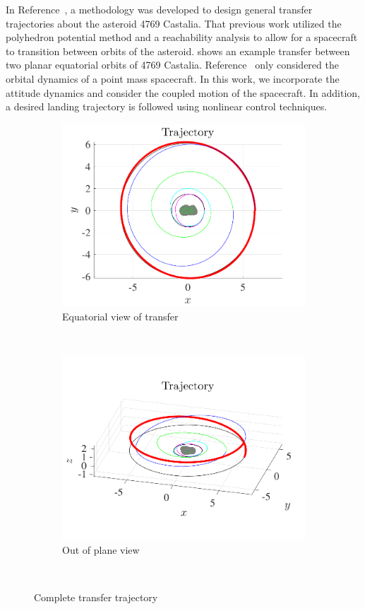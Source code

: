 \documentclass[letterpaper, paper,11pt]{AAS}		%
\begin{document}
In Reference~, a methodology was developed to design general transfer trajectories about the asteroid 4769 Castalia.
That previous work utilized the polyhedron potential method and a reachability analysis to allow for a spacecraft to transition  between orbits of the asteroid.
 shows an example transfer between two planar equatorial orbits of 4769 Castalia.
Reference~ only considered the orbital dynamics of a point mass spacecraft. 
In this work, we incorporate the attitude dynamics and consider the coupled motion of the spacecraft.
In addition, a desired landing trajectory is followed using nonlinear control techniques.
\begin{figure}[htbp] 
    \centering 
    \begin{subfigure}[htbp]{0.45\textwidth} 
        \includegraphics[width=\textwidth]{figures/trajectory.pdf}
        \caption{Equatorial view of transfer} \label{fig:trajectory_up} 
    \end{subfigure}~
    \begin{subfigure}[htbp]{0.45\textwidth} 
        \includegraphics[width=\textwidth]{figures/trajectory_3d.pdf} 
        \caption{Out of plane view} \label{fig:trajectory_3d} 
    \end{subfigure}~ 
    \caption{Complete transfer trajectory}
    \label{fig:trajectory} 
\end{figure}
\end{document}
